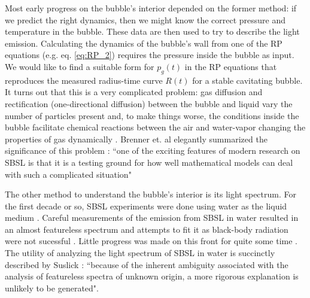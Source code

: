 \documentclass[11pt,prb,aps,nofootinbib,superscriptaddress,floatfix]{revtex4-2}
\begin{document}
Most early progress on the bubble's interior depended on the former method: if we predict the right dynamics, then we might know the correct pressure and temperature in the bubble. These data are then used to try to describe the light emission. Calculating the dynamics of the bubble's wall from one of the RP equations (e.g. eq. \ref{eq:RP_2}) requires the pressure inside the bubble as input. We would like to find a suitable form for $p_g(t)$ in the RP equations that reproduces the measured radius-time curve $R(t)$ for a stable cavitating bubble. It turns out that this is a very complicated problem: gas diffusion and rectification (one-directional diffusion) between the bubble and liquid vary the number of particles present and, to make things worse, the conditions inside the bubble facilitate chemical reactions between the air and water-vapor changing the properties of gas dynamically \cite{brenner2002single}. Brenner et. al elegantly summarized the significance of this problem \cite{brenner2002single}: ``one of the exciting features of modern research on SBSL is that it is a testing ground for how well mathematical models can deal with such a complicated situation"

The other method to understand the bubble's interior is its light spectrum. For the first decade or so, SBSL experiments were done using water as the liquid medium \cite{suslick2008inside,brenner2002single,gaitan1992sonoluminescence}. Careful measurements of the emission from SBSL in water resulted in an almost featureless spectrum and attempts to fit it as black-body radiation were not sucessful \cite{hiller1992spectrum}. Little progress was made on this front for quite some time \cite{brenner2002single}. The utility of analyzing the light spectrum of SBSL in water is succinctly described by Suslick \cite{suslick2008inside}: ``because of the inherent ambiguity associated with the analysis of featureless spectra of unknown origin, a more rigorous explanation is unlikely to be generated". 
\end{document}
